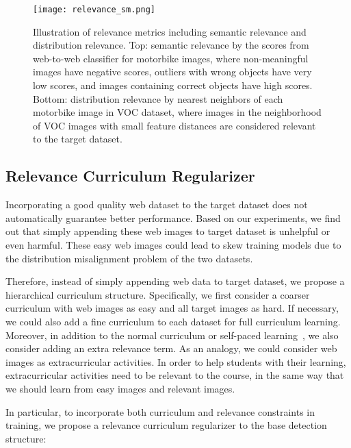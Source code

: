 \documentclass[10pt,twocolumn,letterpaper]{article}
\begin{document}
\begin{figure}
\texttt{[image: relevance\_sm.png]}
\caption{Illustration of relevance metrics including semantic relevance and distribution relevance. Top: semantic relevance by the scores from web-to-web classifier for motorbike images, where non-meaningful images have negative scores, outliers with wrong objects have very low scores, and images containing correct objects have high scores.
Bottom: distribution relevance by  nearest neighbors of each motorbike image in VOC dataset, where images in the neighborhood of VOC images with small feature distances are considered relevant to the target dataset.}
\label{fig:relevance}
\end{figure}


\subsection {Relevance Curriculum Regularizer}




Incorporating a good quality web dataset to the target dataset does not automatically guarantee better performance. Based on our experiments, we find out that simply appending these web images to target dataset is unhelpful or even harmful. These easy web images could lead to skew training models due to the distribution misalignment problem of the two datasets.




Therefore, instead of simply appending web data to target dataset, we propose a hierarchical curriculum structure. Specifically, we first consider a coarser curriculum with web images as easy and all target images as hard. If necessary, we could also add a fine curriculum to each dataset for full curriculum learning. Moreover, in addition to the normal curriculum or self-paced learning~\cite{jiang2015self}, we also consider adding an extra relevance term. As an analogy, we could consider web images as extracurricular activities. In order to help students with their learning, extracurricular activities need to be relevant to the course, in the same way that we should learn from easy images and relevant images.



In particular, to incorporate both curriculum and relevance constraints in training, we propose a relevance curriculum regularizer to the base detection structure:
\end{document}
